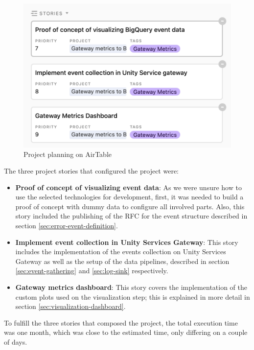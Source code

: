 \documentclass[english, 12pt, a4paper, sci, utf8, a-1b, online]{aaltothesis}
\begin{document}
\begin{figure}[h!]
    \centering
    \includegraphics[scale=0.3]{src/thesis/img/technical-solution/project-planning.png}
    \caption{Project planning on AirTable}
\end{figure}

The three project stories that configured the project were:

\begin{itemize}
    \item \textbf{Proof of concept of visualizing event data}: As we were unsure how to use the selected technologies for development, first, it was needed to build a proof of concept with dummy data to configure all involved parts. Also, this story included the publishing of the RFC for the event structure described in section \ref{sec:error-event-definition}.
    \item \textbf{Implement event collection in Unity Services Gateway}: This story includes the implementation of the events collection on Unity Services Gateway as well as the setup of the data pipelines, described in section \ref{sec:event-gathering} and \ref{sec:log-sink} respectively.
    \item \textbf{Gateway metrics dashboard}: This story covers the implementation of the custom plots used on the visualization step; this is explained in more detail in section \ref{sec:visualization-dashboard}.
\end{itemize}

To fulfill the three stories that composed the project, the total execution time was one month, which was close to the estimated time, only differing on a couple of days.
\end{document}

